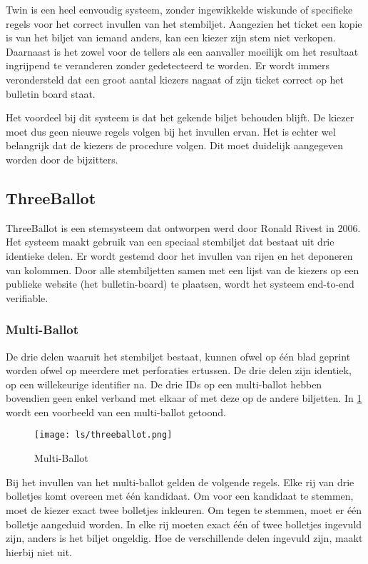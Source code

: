 \npar Twin is een heel eenvoudig systeem, zonder ingewikkelde wiskunde of specifieke regels voor het correct invullen van het stembiljet. Aangezien het ticket een kopie is van het biljet van iemand anders, kan een kiezer zijn stem niet verkopen. Daarnaast is het zowel voor de tellers als een aanvaller moeilijk om het resultaat ingrijpend te veranderen zonder gedetecteerd te worden. Er wordt immers verondersteld dat een groot aantal kiezers nagaat of zijn ticket correct op het bulletin board staat.

\npar Het voordeel bij dit systeem is dat het gekende biljet behouden blijft. De kiezer moet dus geen nieuwe regels volgen bij het invullen ervan. Het is echter wel belangrijk dat de kiezers de procedure volgen. Dit moet duidelijk aangegeven worden door de bijzitters.

\subsection[ThreeBallot]{ThreeBallot~\cite{rivest_threeballot}}
\label{sec:ls:threeballot}

ThreeBallot is een stemsysteem dat ontworpen werd door Ronald Rivest in 2006. Het systeem maakt gebruik van een speciaal stembiljet dat bestaat uit drie identieke delen. Er wordt gestemd door het invullen van rijen en het deponeren van kolommen. Door alle stembiljetten samen met een lijst van de kiezers op een publieke website (het bulletin-board) te plaatsen, wordt het systeem end-to-end verifiable.

\subsubsection{Multi-Ballot}
\label{sec:ls:multi-ballot}

De drie delen waaruit het stembiljet bestaat, kunnen ofwel op één blad geprint worden ofwel op meerdere met perforaties ertussen. De drie delen zijn identiek, op een willekeurige identifier na. De drie IDs op een multi-ballot hebben bovendien geen enkel verband met elkaar of met deze op de andere biljetten. In \ref{fig:ls:threeballot} wordt een voorbeeld van een multi-ballot getoond.

\begin{figure}
  \centering
  \texttt{[image: ls/threeballot.png]}
  \caption[Multi-Ballot]{Multi-Ballot~\cite{rivest_threeballot}}
  \label{fig:ls:threeballot}
\end{figure}

\npar Bij het invullen van het multi-ballot gelden de volgende regels. Elke rij van drie bolletjes komt overeen met \'e\'en kandidaat. Om voor een kandidaat te stemmen, moet de kiezer exact twee bolletjes inkleuren. Om tegen te stemmen, moet er \'e\'en bolletje aangeduid worden. In elke rij moeten exact \'e\'en of twee bolletjes ingevuld zijn, anders is het biljet ongeldig. Hoe de verschillende delen ingevuld zijn, maakt hierbij niet uit.

